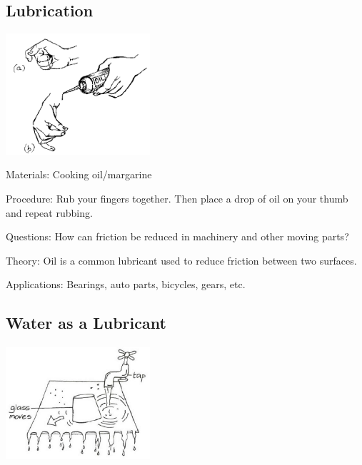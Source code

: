 \begin{multicols}{2}
\subsection{Lubrication}

\begin{center}
\includegraphics[width=0.4\textwidth]{./img/source/lubrication.png}
\end{center}

\begin{description*}
\item[Materials:]{Cooking oil/margarine}
\item[Procedure:]{Rub your fingers together. Then place a drop of oil on your thumb and repeat rubbing.}
\item[Questions:]{How can friction be reduced in machinery and other moving parts?}
\item[Theory:]{Oil is a common lubricant used to reduce friction between two surfaces.}
\item[Applications:]{Bearings, auto parts, bicycles, gears, etc.}
\end{description*}

\subsection{Water as a Lubricant}

\begin{center}
\includegraphics[width=0.4\textwidth]{./img/vso/water-lubricant.png}
\end{center}


\end{multicols}
